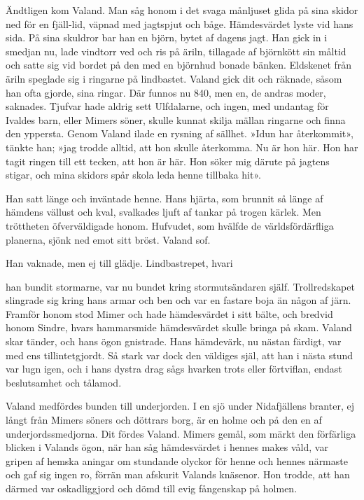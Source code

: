 Ändtligen kom Valand. Man såg honom i det svaga månljuset glida på sina
skidor ned för en fjäll-lid, väpnad med jagtspjut och båge. Hämdesvärdet
lyste vid hans sida. På sina skuldror bar han en björn, bytet af dagens
jagt. Han gick in i smedjan nu, lade vindtorr ved och ris på äriln,
tillagade af björnkött sin måltid och satte sig vid bordet på den med en
björnhud bonade bänken. Eldskenet från äriln speglade sig i ringarne på
lindbastet. Valand gick dit och räknade, såsom han ofta gjorde, sina
ringar. Där funnos nu 840, men en, de andras moder, saknades. Tjufvar
hade aldrig sett Ulfdalarne, och ingen, med undantag för Ivaldes barn,
eller Mimers söner, skulle kunnat skilja mällan ringarne och finna den
yppersta. Genom Valand ilade en rysning af sällhet. »Idun har
återkommit», tänkte han; »jag trodde alltid, att hon skulle återkomma.
Nu är hon här. Hon har tagit ringen till ett tecken, att hon är här. Hon
söker mig därute på jagtens stigar, och mina skidors spår skola leda
henne tillbaka hit».

Han satt länge och inväntade henne. Hans hjärta, som brunnit så länge af
hämdens vällust och kval, svalkades ljuft af tankar på trogen kärlek.
Men tröttheten öfverväldigade honom. Hufvudet, som hvälfde de
världsfördärfliga planerna, sjönk ned emot sitt bröst. Valand sof.

Han vaknade, men ej till glädje. Lindbastrepet, hvari

han bundit stormarne, var nu bundet kring stormutsändaren själf.
Trollredskapet slingrade sig kring hans armar och ben och var en fastare
boja än någon af järn. Framför honom stod Mimer och hade hämdesvärdet i
sitt bälte, och bredvid honom Sindre, hvars hammarsmide hämdesvärdet
skulle bringa på skam. Valand skar tänder, och hans ögon gnistrade. Hans
hämdevärk, nu nästan färdigt, var med ens tillintetgjordt. Så stark var
dock den väldiges själ, att han i nästa stund var lugn igen, och i hans
dystra drag sågs hvarken trots eller förtviflan, endast beslutsamhet och
tålamod.

Valand medfördes bunden till underjorden. I en sjö under Nidafjällens
branter, ej långt från Mimers söners och döttrars borg, är en holme och
på den en af underjordssmedjorna. Dit fördes Valand. Mimers gemål, som
märkt den förfärliga blicken i Valands ögon, när han såg hämdesvärdet i
hennes makes våld, var gripen af hemska aningar om stundande olyckor för
henne och hennes närmaste och gaf sig ingen ro, förrän man afskurit
Valands knäsenor. Hon trodde, att han därmed var oskadliggjord och dömd
till evig fångenskap på holmen.

